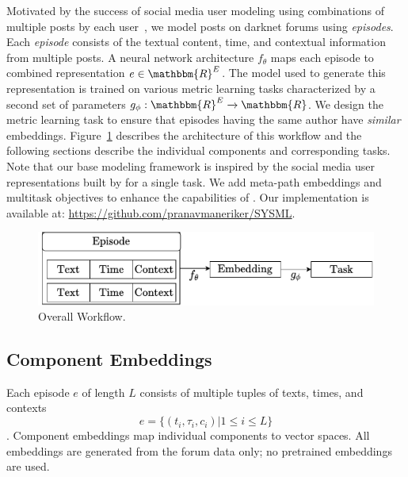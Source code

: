 \label{sec:sysml:method}
Motivated by the success of social media user modeling using combinations of multiple posts by each user~\cite{andrews2019learning,noorshams2020ties}, we model posts on darknet forums using \textit{episodes}.
Each \textit{episode} consists of the textual content, time, and contextual information from multiple posts. 
A neural network architecture $f_{\theta}$ maps each episode to combined representation $e \in \mathbbm{R}^E$.
The model used to generate this representation is trained on various metric learning tasks characterized by a second set of parameters $g_{\phi}: \mathbbm{R}^E \xrightarrow[]{} \mathbbm{R}$.
We design the metric learning task to ensure that episodes having the same author have \textit{similar} embeddings.
Figure~\ref{fig:main_workflow} describes the architecture of this workflow and the following sections describe the individual components and corresponding tasks. 
Note that our base modeling framework is inspired by the social media user representations built by \citet{andrews2019learning} for a single task. 
We add meta-path embeddings and multitask objectives to enhance the capabilities of 
\SYSMLmethodname{}. 
Our implementation is available at: \url{https://github.com/pranavmaneriker/SYSML}.

\begin{figure}[!htbp]
    \centering
    \includegraphics[width=\linewidth]{sysml/figures/MainFlowchart.pdf}
    \caption{Overall \SYSMLmethodname{} Workflow.}
    \label{fig:main_workflow}
\end{figure}

\subsection{Component Embeddings}
Each episode $e$ of length $L$ consists of multiple tuples of texts, times, and contexts 
\[
    e = \{(t_i, \tau_i, c_i) | 1 \leq i \leq L\} 
\]. 
Component embeddings map individual components to vector spaces. 
All embeddings are generated from the forum data only; no pretrained embeddings are used.

